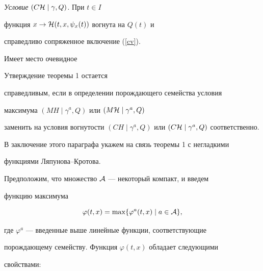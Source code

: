 \medskip





{\it Условие} $(C{\cal H}\mid \gamma,Q)$. При $t\in I$


функция $x\rightarrow {\cal H}(t,x,\psi_x (t))$ вогнута на $Q(t)$ и


справедливо сопряженное включение (\ref{cv}).


\medskip





Имеет место очевидное





\begin{cor}


Утверждение теоремы 1 остается


справедливым, если в определении порождающего семейства условия


максимума $(MH\mid \gamma^a, Q)$ или $(M{\cal H}\mid \gamma^a, Q)$


заменить на условия вогнутости $(CH\mid \gamma^a, Q)$ или $(C{\cal


H}\mid \gamma^a,Q)$ соответственно.


\end{cor}





В заключение этого параграфа укажем на связь теоремы 1 с негладкими


функциями Ляпунова--Кротова.





Предположим, что множество ${\cal A}$ --- некоторый компакт, и введем


функцию максимума


\begin{equation}


\varphi (t,x)=\max \{\varphi^a (t,x)\mid a\in {\cal A}\},


\label{34}


\end{equation}


где $\varphi^a$ --- введенные выше линейные функции, соответствующие


порождающему семейству. Функция $\varphi (t,x)$ обладает следующими


свойствами:


